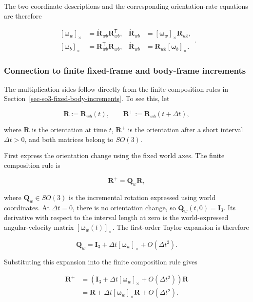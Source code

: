 \documentclass[
  australian,
  12pt,
  letterpaper,
  DIV=11,
  numbers=noendperiod,
  twoside]{scrreprt}
\begin{document}
The two coordinate descriptions and the corresponding orientation-rate
equations are therefore

\[
\boxed{
\begin{aligned}
\left[\boldsymbol\omega_w\right]_\times
&=
\dot{\mathbf R}_{wb}\mathbf R_{wb}^\mathsf T,
&
\dot{\mathbf R}_{wb}
&=
[\boldsymbol\omega_w]_\times\mathbf R_{wb},\\
[\boldsymbol\omega_b]_\times
&=
\mathbf R_{wb}^\mathsf T\dot{\mathbf R}_{wb},
&
\dot{\mathbf R}_{wb}
&=
\mathbf R_{wb}[\boldsymbol\omega_b]_\times.
\end{aligned}
}.
\]

\subsubsection{Connection to finite fixed-frame and body-frame
increments}\label{connection-to-finite-fixed-frame-and-body-frame-increments}

The multiplication sides follow directly from the finite composition
rules in Section~\ref{sec-so3-fixed-body-increments}. To see this, let

\[
\mathbf R
\mathrel{:=}
\mathbf R_{wb}(t),
\qquad
\mathbf R^+
\mathrel{:=}
\mathbf R_{wb}(t+\Delta t),
\]

where \(\mathbf R\) is the orientation at time \(t\), \(\mathbf R^+\) is
the orientation after a short interval \(\Delta t>0\), and both matrices
belong to \(SO(3)\).

First express the orientation change using the fixed world axes. The
finite composition rule is

\[
\mathbf R^+
=
\mathbf Q_w\mathbf R,
\]

where \(\mathbf Q_w\in SO(3)\) is the incremental rotation expressed
using world coordinates. At \(\Delta t=0\), there is no orientation
change, so \(\mathbf Q_w(t,0)=\mathbf I_3\). Its derivative with respect
to the interval length at zero is the world-expressed angular-velocity
matrix \([\boldsymbol\omega_w(t)]_\times\). The first-order Taylor
expansion is therefore

\[
\mathbf Q_w
=
\mathbf I_3
+
\Delta t[\boldsymbol\omega_w]_\times
+
O(\Delta t^2).
\]

Substituting this expansion into the finite composition rule gives

\[
\begin{aligned}
\mathbf R^+
&=
\left(
\mathbf I_3
+
\Delta t[\boldsymbol\omega_w]_\times
+
O(\Delta t^2)
\right)\mathbf R\\
&=
\mathbf R
+
\Delta t[\boldsymbol\omega_w]_\times\mathbf R
+
O(\Delta t^2).
\end{aligned}
\]
\end{document}
